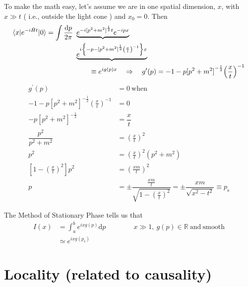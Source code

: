 \documentclass{article}
\begin{document}
\noindent To make the math easy, let's assume we are in one spatial dimension, $x$, with $ x \gg t $ ( i.e., outside the light cone ) and $ x_0 = 0 $.
Then
\begin{align*}
\braket{ x | e^{ -i \hat{H} t } | 0 } = \int \dfrac{\mathrm{d} p}{2 \pi} ~ & \underbrace{e^{ -i {[ p^2 + m^2 ]}^\frac{1}{2} t  } e^{ -i p x }} \\
& \underbrace{e^{ i \left\lbrace -p - {[ p^2 + m^2 ]}^\frac{1}{2} {\left( \frac{x}{t} \right)}^{-1} \right\rbrace x }} \\
&\qquad \equiv e^{ i g(p) x } \quad \Rightarrow \quad g^\prime (p) = -1 - p {[ p^2 + m^2 ]}^{ -\frac{1}{2} } {\left( \frac{x}{t} \right)}^{-1}
\end{align*}
\begin{align*}
g^\prime (p) &= 0 ~ \mathrm{when} \\
-1 - p {[ p^2 + m^2 ]}^{ -\frac{1}{2} } {\left( \frac{x}{t} \right)}^{-1} &= 0 \\
-p {[ p^2 + m^2 ]}^{ -\frac{1}{2} } &= \dfrac{x}{t} \\
\dfrac{p^2}{ p^2 + m^2 } &= {\left( \frac{x}{t} \right)}^2 \\
p^2 &= {\left( \frac{x}{t} \right)}^2 \left( p^2 + m^2 \right) \\
\left[ 1 - {\left( \frac{x}{t} \right)}^2 \right] p^2 &= {\left( \frac{ x m }{t} \right)}^2 \\
p &= \pm \dfrac{ \frac{ x m }{t} }{ \sqrt{ 1 - {\left( \frac{x}{t} \right)}^2 } } = \pm \dfrac{ x m }{ \sqrt{ x^2 - t^2 } } \equiv p_\mathrm{s}
\end{align*}


\noindent The Method of Stationary Phase tells us that
\begin{align*}
I(x) &= \int_a^b e^{ i x g(p) } \mathrm{d}p \qquad \qquad x \gg 1, ~ g(p) \in \mathbb{R} ~ \mathrm{and} ~ \mathrm{smooth} \\
&\simeq e^{ i x g(p_\mathrm{s}) }
\end{align*}



\section{Locality (related to causality)}
\end{document}
